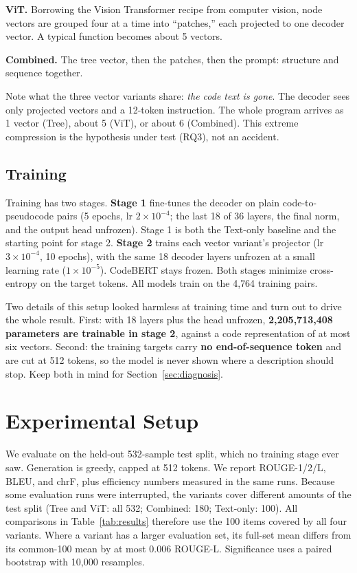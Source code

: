 \documentclass[conference]{IEEEtran}
\newcommand{\NTrain}{4{,}764}
\newcommand{\NTest}{532}
\begin{document}
\textbf{ViT.} Borrowing the Vision Transformer recipe from computer vision, node vectors are grouped four at a time into ``patches,'' each projected to one decoder vector. A typical function becomes about 5 vectors.

\textbf{Combined.} The tree vector, then the patches, then the prompt: structure and sequence together.

Note what the three vector variants share: \emph{the code text is gone}. The decoder sees only projected vectors and a 12-token instruction. The whole program arrives as 1 vector (Tree), about 5 (ViT), or about 6 (Combined). This extreme compression is the hypothesis under test (RQ3), not an accident.

\subsection{Training}
\label{sec:training}
Training has two stages. \textbf{Stage 1} fine-tunes the decoder on plain code-to-pseudocode pairs (5 epochs, lr $2{\times}10^{-4}$; the last 18 of 36 layers, the final norm, and the output head unfrozen). Stage 1 is both the Text-only baseline and the starting point for stage 2. \textbf{Stage 2} trains each vector variant's projector (lr $3{\times}10^{-4}$, 10 epochs), with the same 18 decoder layers unfrozen at a small learning rate ($1{\times}10^{-5}$). CodeBERT stays frozen. Both stages minimize cross-entropy on the target tokens. All models train on the \NTrain{} training pairs.

Two details of this setup looked harmless at training time and turn out to drive the whole result. First: with 18 layers plus the head unfrozen, \textbf{2{,}205{,}713{,}408 parameters are trainable in stage 2}, against a code representation of at most six vectors. Second: the training targets carry \textbf{no end-of-sequence token} and are cut at 512 tokens, so the model is never shown where a description should stop. Keep both in mind for Section~\ref{sec:diagnosis}.

\section{Experimental Setup}
\label{sec:setup}

We evaluate on the held-out \NTest{}-sample test split, which no training stage ever saw. Generation is greedy, capped at 512 tokens. We report ROUGE-1/2/L, BLEU, and chrF, plus efficiency numbers measured in the same runs. Because some evaluation runs were interrupted, the variants cover different amounts of the test split (Tree and ViT: all \NTest{}; Combined: 180; Text-only: 100). All comparisons in Table~\ref{tab:results} therefore use the 100 items covered by all four variants. Where a variant has a larger evaluation set, its full-set mean differs from its common-100 mean by at most 0.006 ROUGE-L. Significance uses a paired bootstrap with 10{,}000 resamples.
\end{document}
